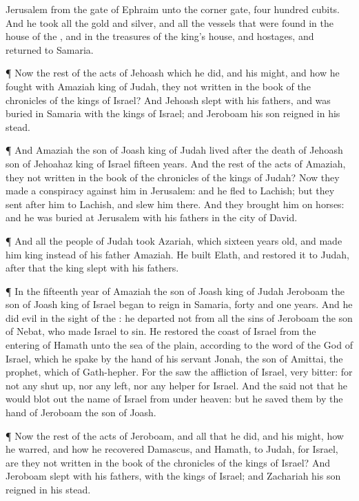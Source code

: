 {Jerusalem from the
gate of
Ephraim unto the
corner
gate,
four
hundred
cubits.
And he
took all the
gold and
silver, and all the
vessels that were
found in the
house of the
{}, and in the
treasures of the
king’s
house, and
hostages, and
returned to
Samaria.
\par }{\PP {}¶ Now the
rest of the
acts of
Jehoash which he
did, and his
might, and how he
fought with
Amaziah
king of
Judah,
{} they not
written in the
book of the
chronicles of the
kings of
Israel?
And
Jehoash
slept with his
fathers, and was
buried in
Samaria with the
kings of
Israel; and
Jeroboam his
son
reigned in his stead.
\par }{\PP {}¶ And
Amaziah the
son of
Joash
king of
Judah
lived
after the
death of
Jehoash
son of
Jehoahaz
king of
Israel
fifteen
years.
And the
rest of the
acts of
Amaziah,
{} they not
written in the
book of the
chronicles of the
kings of
Judah?
Now they
made a
conspiracy against him in
Jerusalem: and he
fled to
Lachish; but they
sent
after him to
Lachish, and
slew him there.
And they
brought him on
horses: and he was
buried at
Jerusalem with his
fathers in the
city of
David.
\par }{\PP {}¶ And all the
people of
Judah
took
Azariah, which
{}
sixteen
years
old, and made him
king instead of his
father
Amaziah.
He
built
Elath, and
restored it to
Judah,
after that the
king
slept with his
fathers.
\par }{\PP {}¶ In the
fifteenth
year of
Amaziah the
son of
Joash
king of
Judah
Jeroboam the
son of
Joash
king of
Israel began to
reign in
Samaria,
{}
forty and
one
years.
And he
did
{}
evil in the
sight of the
{}: he
departed not from all the
sins of
Jeroboam the
son of
Nebat, who made
Israel to
sin.
He
restored the
coast of
Israel from the
entering of
Hamath unto the
sea of the
plain, according to the
word of the
{}
God of
Israel, which he
spake by the
hand of his
servant
Jonah, the
son of
Amittai, the
prophet, which
{} of
Gath-hepher.
For the
{}
saw the
affliction of
Israel,
{}
very
bitter: for
{}
not any shut
up, nor any
left, nor any
helper for
Israel.
And the
{}
said not that he would blot
out the
name of
Israel from under
heaven: but he
saved them by the
hand of
Jeroboam the
son of
Joash.
\par }{\PP {}¶ Now the
rest of the
acts of
Jeroboam, and all that he
did, and his
might, how he
warred, and how he
recovered
Damascus, and
Hamath,
{} to
Judah, for
Israel, are they not
written in the
book of the
chronicles of the
kings of
Israel?
And
Jeroboam
slept with his
fathers,
{} with the
kings of
Israel; and
Zachariah his
son
reigned in his stead.

}
